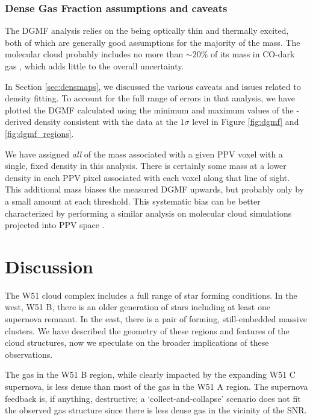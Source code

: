 \subsubsection{Dense Gas Fraction assumptions and caveats}

The DGMF analysis relies on the \thirteenco being optically thin and thermally
excited, both of which are generally good assumptions for the majority of the
mass.  The molecular cloud probably includes no more than $\sim20\%$ of its mass
in CO-dark gas \citep{Pineda2013a,Langer2013a,Smith2014b}, which adds little to
the overall uncertainty.

In Section \ref{sec:densmaps}, we discussed the various caveats and issues
related to \formaldehyde density fitting.  To account for the full range of
errors in that analysis, we have plotted the DGMF calculated using the minimum
and maximum values of the \formaldehyde-derived density consistent with the
data at the $1\sigma$ level in Figure \ref{fig:dgmf} and
\ref{fig:dgmf_regions}.

We have assigned \emph{all} of the mass associated with a given PPV voxel with
a single, fixed density in this analysis.  There is certainly some mass at a
lower density in each PPV pixel associated with each voxel along that line of
sight.  This additional mass biases the measured DGMF upwards,
but probably only by a small amount at each
threshold.  This systematic bias can be better characterized by performing a
similar analysis on molecular cloud simulations projected into PPV space
\citep[as demonstrated for other analysis techniques by][]{Beaumont2013a}.


\section{Discussion}
\label{sec:discussion}
The W51 cloud complex includes a full range of star forming conditions.  In the
west, W51 B, there is an older generation of stars including at least one supernova
remnant.  In the east, there is a pair of forming, still-embedded massive clusters.
We have described the geometry of these regions and features of the cloud structures,
now we speculate on the broader implications of these observations.

The gas in the W51 B region, while clearly impacted by the expanding W51 C
supernova, is less dense than most of the gas in the W51 A region.  The
supernova feedback is, if anything, destructive; a `collect-and-collapse'
scenario does not fit the observed gas structure since there is less dense
gas in the vicinity of the SNR.


